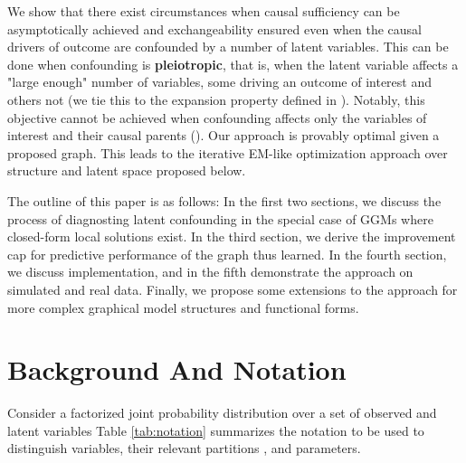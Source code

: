 \documentclass[letterpaper]{article}
\begin{document}
We show that there exist circumstances when causal sufficiency can be asymptotically achieved and exchangeability ensured even when the causal drivers of outcome are confounded by a number of latent variables.  This can be done when confounding is \textbf{pleiotropic}, that is,  when the latent variable affects a "large enough" number of variables, some driving an outcome of interest and others not (we tie this to the expansion property defined in \cite{anandkumar_learning_2013}).  Notably, this objective cannot be achieved when confounding affects only the variables of interest and their causal parents (\cite{damour_multi-cause_2019}).  Our approach is provably optimal given a proposed graph. This leads to the iterative EM-like optimization approach over structure and latent space proposed below.

The outline of this paper is as follows: In the first two sections, we discuss the process of diagnosting latent confounding in the special case of GGMs where closed-form local solutions exist. In the third section, we derive the improvement cap for predictive performance of the graph thus learned. In the fourth section, we discuss implementation, and in the fifth demonstrate the approach on simulated and real data. Finally, we propose some extensions to the approach for more complex graphical model structures and functional forms. 

\section{Background And Notation}
\label{Background}

Consider a factorized joint probability distribution over a set of observed and latent variables Table \ref{tab:notation} summarizes the notation to be used to distinguish variables, their relevant partitions , and parameters. 
\end{document}
